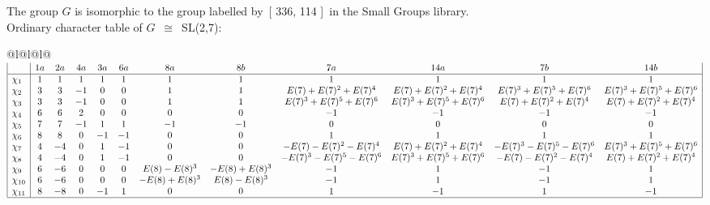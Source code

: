 \documentclass[varwidth=\maxdimen,border=10]{standalone}
\begin{document}
The group $G$ is isomorphic to the group labelled by\ [ 336, 114 ]\ in the Small Groups library.\\
Ordinary character table of $G$\ $\cong$\ SL(2,7):\\
\begin{center}
\begin{tabular}{@{}l@{}l@{}l@{}}
\hline
\(\begin{array}{|l|ccccccccccc|}
  & 1a & 2a & 4a & 3a & 6a & 8a & 8b & 7a & 14a & 7b & 14b\\ \hline
\chi_{1} & 1 & 1 & 1 & 1 & 1 & 1 & 1 & 1 & 1 & 1 & 1\\
\chi_{2} & 3 & 3 & -1 & 0 & 0 & 1 & 1 & E(7)+E(7)^{2}+E(7)^{4} & E(7)+E(7)^{2}+E(7)^{4} & E(7)^{3}+E(7)^{5}+E(7)^{6} & E(7)^{3}+E(7)^{5}+E(7)^{6}\\
\chi_{3} & 3 & 3 & -1 & 0 & 0 & 1 & 1 & E(7)^{3}+E(7)^{5}+E(7)^{6} & E(7)^{3}+E(7)^{5}+E(7)^{6} & E(7)+E(7)^{2}+E(7)^{4} & E(7)+E(7)^{2}+E(7)^{4}\\
\chi_{4} & 6 & 6 & 2 & 0 & 0 & 0 & 0 & -1 & -1 & -1 & -1\\
\chi_{5} & 7 & 7 & -1 & 1 & 1 & -1 & -1 & 0 & 0 & 0 & 0\\
\chi_{6} & 8 & 8 & 0 & -1 & -1 & 0 & 0 & 1 & 1 & 1 & 1\\
\chi_{7} & 4 & -4 & 0 & 1 & -1 & 0 & 0 & -E(7)-E(7)^{2}-E(7)^{4} & E(7)+E(7)^{2}+E(7)^{4} & -E(7)^{3}-E(7)^{5}-E(7)^{6} & E(7)^{3}+E(7)^{5}+E(7)^{6}\\
\chi_{8} & 4 & -4 & 0 & 1 & -1 & 0 & 0 & -E(7)^{3}-E(7)^{5}-E(7)^{6} & E(7)^{3}+E(7)^{5}+E(7)^{6} & -E(7)-E(7)^{2}-E(7)^{4} & E(7)+E(7)^{2}+E(7)^{4}\\
\chi_{9} & 6 & -6 & 0 & 0 & 0 & E(8)-E(8)^{3} & -E(8)+E(8)^{3} & -1 & 1 & -1 & 1\\
\chi_{10} & 6 & -6 & 0 & 0 & 0 & -E(8)+E(8)^{3} & E(8)-E(8)^{3} & -1 & 1 & -1 & 1\\
\chi_{11} & 8 & -8 & 0 & -1 & 1 & 0 & 0 & 1 & -1 & 1 & -1\\
\hline
\end{array}\)\\
\end{tabular}
\end{center}
\end{document}

